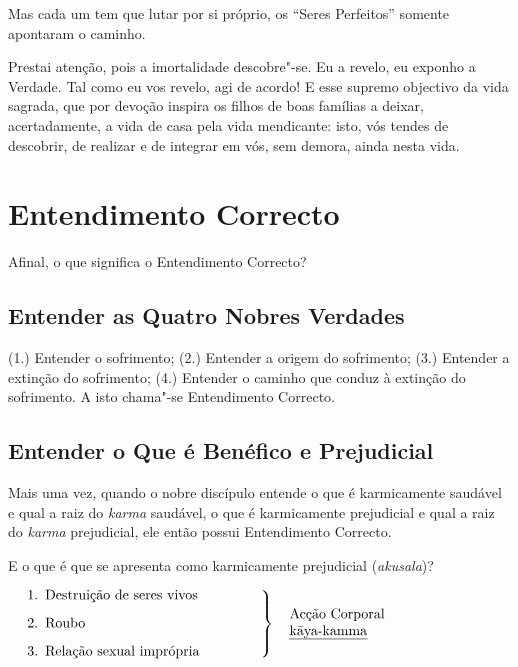 
Mas cada um tem que lutar por si próprio, os “Seres Perfeitos” somente
apontaram o caminho.


Prestai atenção, pois a imortalidade descobre"-se. Eu a revelo, eu exponho a
Verdade. Tal como eu vos revelo, agi de acordo! E esse supremo objectivo da
vida sagrada, que por devoção inspira os filhos de boas famílias a deixar,
acertadamente, a vida de casa pela vida mendicante: isto, vós tendes de
descobrir, de realizar e de integrar em vós, sem demora, ainda nesta vida.


\clearpage

\section{Entendimento Correcto}



Afinal, o que significa o Entendimento Correcto?

\subsection{Entender as Quatro Nobres Verdades}

(1.) Entender o sofrimento;
(2.) Entender a origem do sofrimento;
(3.) Entender a extinção do sofrimento;
(4.) Entender o caminho que conduz à extinção do sofrimento.
A isto chama"-se Entendimento Correcto.


\subsection{Entender o Que é Benéfico e Prejudicial}

Mais uma vez, quando o nobre discípulo entende o que é karmicamente saudável e
qual a raiz do \emph{karma} saudável, o que é karmicamente prejudicial e qual a
raiz do \emph{karma} prejudicial, ele então possui Entendimento Correcto.

E o que é que se apresenta como karmicamente prejudicial (\emph{akusala})?

\bigskip

$\left.
\begin{minipage}{0.52\linewidth}
\raggedright
\begin{enumerate}
  \item Destruição de seres vivos
  \item Roubo
  \item Relação sexual imprópria
\end{enumerate}
\end{minipage}
\right\}
\hspace*{10pt}\parbox{0.4\linewidth}{Acção Corporal\\ \emph{kāya-kamma}}
$

